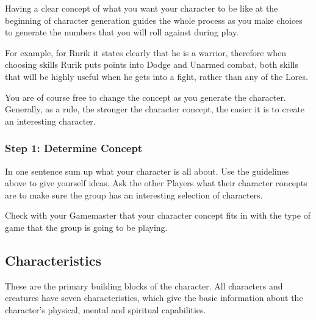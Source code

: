 Having a clear concept of what you want your character to be like at the beginning of character generation guides the whole process as you make choices to generate the numbers that you will roll against during play.

For example, for Rurik it states clearly that he is a warrior, therefore when choosing skills Rurik puts points into Dodge and Unarmed combat, both skills that will be highly useful when he gets into a fight, rather than any of the Lores.

You are of course free to change the concept as you generate the character. Generally, as a rule, the stronger the character concept, the easier it is to create an interesting character.




\subsubsection{Step 1: Determine Concept}
In one sentence sum up what your character is all about. Use the guidelines above to give yourself ideas. Ask the other Players what their character concepts are to make sure the group has an interesting selection of characters.

Check with your Gamemaster that your character concept fits in with the type of game that the group is going to be playing.

\subsection{Characteristics}
These are the primary building blocks of the character. All characters and creatures have seven characteristics, which give the basic information about the character’s physical, mental and spiritual capabilities.

